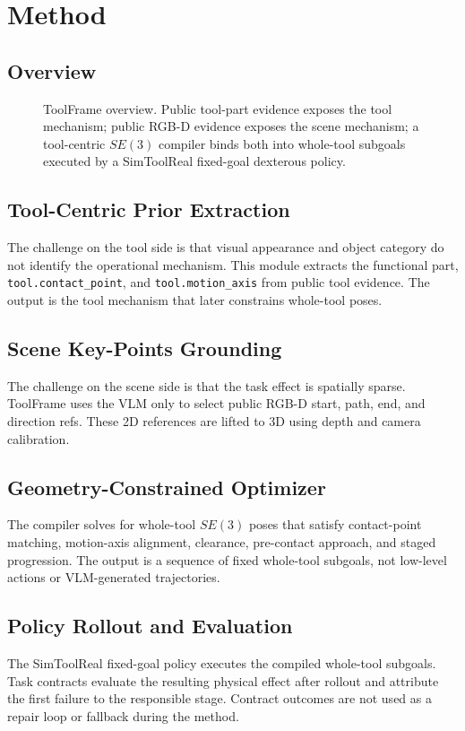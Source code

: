 \documentclass[letterpaper, 10 pt, journal, twoside]{IEEEtran}
\newcommand{\method}{ToolFrame}
\begin{document}
\section{Method}
\subsection{Overview}
\begin{figure}[t]
\centering
{}
\caption{\method{} overview. Public tool-part evidence exposes the tool
mechanism; public RGB-D evidence exposes the scene mechanism; a tool-centric
$SE(3)$ compiler binds both into whole-tool subgoals executed by a SimToolReal
fixed-goal dexterous policy.}
\label{fig:overview}
\end{figure}

\subsection{Tool-Centric Prior Extraction}
The challenge on the tool side is that visual appearance and object category do
not identify the operational mechanism. This module extracts the functional
part, \texttt{tool.contact\_point}, and \texttt{tool.motion\_axis} from public
tool evidence. The output is the tool mechanism that later constrains
whole-tool poses.

\subsection{Scene Key-Points Grounding}
The challenge on the scene side is that the task effect is spatially sparse.
\method{} uses the VLM only to select public RGB-D start, path, end, and
direction refs. These 2D references are lifted to 3D using depth and camera
calibration.

\subsection{Geometry-Constrained Optimizer}
The compiler solves for whole-tool $SE(3)$ poses that satisfy contact-point
matching, motion-axis alignment, clearance, pre-contact approach, and staged
progression. The output is a sequence of fixed whole-tool subgoals, not
low-level actions or VLM-generated trajectories.

\subsection{Policy Rollout and Evaluation}
The SimToolReal fixed-goal policy executes the compiled whole-tool subgoals.
Task contracts evaluate the resulting physical effect after rollout and
attribute the first failure to the responsible stage. Contract outcomes are not
used as a repair loop or fallback during the method.
\end{document}

